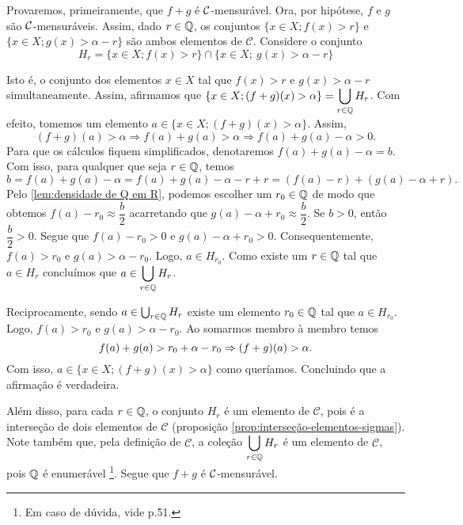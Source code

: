 \begin{prova}
    Provaremos, primeiramente, que $f+g$ é $\operatorname{\mathcal{C}}$-mensurável.
    Ora, por hipótese, $f$ e $g$ são $\operatorname{\mathcal{C}}$-mensuráveis. 
    Assim, dado $r \in \operatorname{\mathbb{Q}}$, os conjuntos $\{x \in X; f(x) > r\}$ e 
    $\{x \in X; g(x) > \alpha -r\}$ são ambos elementos de $\mathcal{C}$.
    Considere o conjunto  
    \vspace{-0.2cm}
    $$H_r = \{x \in X; f(x) > r\} \cap \{x \in X;\ g(x) > \alpha -r\}$$
    
    \vspace{-0.2cm}
    Isto é, o conjunto dos elementos $x \in X$ tal que $f(x) 
    > r$ e $g(x) >\alpha -r$ simultaneamente.
    Assim, afirmamos que $\{x \in X; (f+g)(x) > \alpha\} = \displaystyle \bigcup_{r \in \operatorname{\mathbb{Q}}} H_r$. Com efeito, tomemos um elemento 
    $a \in \{x \in X; (f+g)(x) > \alpha\}$.
    Assim, 
    $$
    (f+g)(a) > \alpha 
    \Rightarrow 
    f(a) + g(a) > \alpha 
    \Rightarrow f(a) + g(a) - \alpha > 0. 
    $$
    Para que os cálculos fiquem simplificados, denotaremos $f(a) + g(a) - \alpha = b$.
    Com isso, para qualquer que seja $r \in \operatorname{\mathbb{Q}}$, temos
    $$
    b 
    =
    f(a) + g(a) -\alpha 
    =
    f(a) + g(a) -\alpha - r + r
    =
    (f(a) -r) + (g(a) -\alpha + r).
    $$ 
    Pelo \ref{lem:densidade de Q em R}, podemos escolher um $r_0 \in \operatorname{\mathbb{Q}}$ de modo que obtemos $f(a) - r_0 \approx \dfrac{b}{2}$ acarretando que $g(a) -\alpha + r_0 \approx \dfrac{b}{2}$.
    Se $b > 0$, então $\dfrac{b}{2} > 0$.
    Segue que $f(a) - r_0 > 0 $ e $g(a) -\alpha + r_0 > 0$. 
    Consequentemente, $f(a) > r_0  $ e $g(a) > \alpha - r_0$.
    Logo, $a \in H_{r_0}$.
    Como existe um $r \in \operatorname{\mathbb{Q}}$ tal que $a \in H_{r}$ concluímos que $ \displaystyle a \in \bigcup_{r \in \operatorname{\mathbb{Q}}} H_r$.
    
    Reciprocamente, sendo $a \in \bigcup_{r \in \operatorname{\mathbb{Q}}} H_r$ existe um elemento $r_0 \in \operatorname{\mathbb{Q}}$ tal que $a \in H_{r_0}$.
    Logo, $f(a) > r_0$ e $g(a) > \alpha -r_0$.
    Ao somarmos membro à membro temos
    \vspace{-0.2cm}
    $$
    f(a) + g(a) > r_0 + \alpha -r_0
    \Rightarrow
    (f + g)(a) > \alpha. 
    \vspace{-0.2cm}
    $$
    Com isso, $a \in \{x \in X; (f +g)(x) > \alpha\}$ como queríamos.
    Concluindo que a afirmação é verdadeira. 
    
    Além disso, para cada $r \in \operatorname{\mathbb{Q}}$, o conjunto $H_r$ é um elemento de $\mathcal{C}$, pois é  a interseção de dois elementos de $\mathcal{C}$ (proposição \ref{prop:interseção-elementos-sigmas}).
    Note também que, pela definição de $\mathcal{C}$, a coleção $\displaystyle \bigcup_{r \in \operatorname{\mathbb{Q}}} H_r$ é um elemento de $\mathcal{C}$, pois $\operatorname{\mathbb{Q}}$ é enumerável
    \footnote{Em caso de dúvida, vide \supercite{elon}{p.51}.}.
    Segue que $f+g$ é $\operatorname{\mathcal{C}}$-mensurável.


\end{prova}
